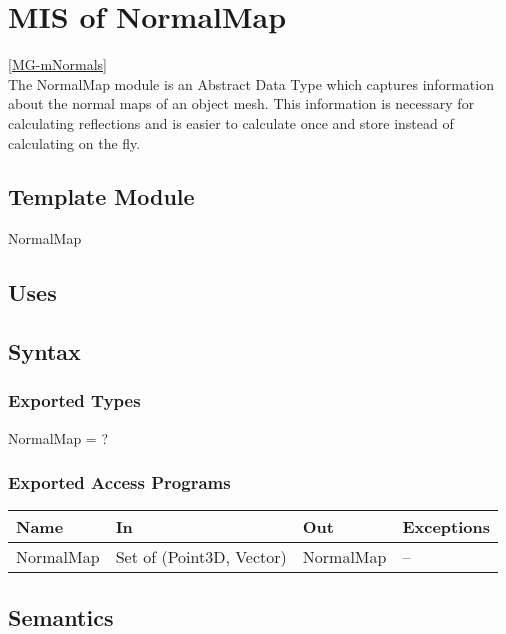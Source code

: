 \documentclass[12pt, titlepage]{article}
\begin{document}
\newpage

\section{MIS of NormalMap} \ref{MG-mNormals} \\
The NormalMap module is an Abstract Data Type which captures information about 
the normal maps of an object mesh. This information is necessary for 
calculating reflections and is easier to calculate once and store instead of 
calculating on the fly.

\subsection{Template Module}
NormalMap

\subsection{Uses}

\subsection{Syntax}
\subsubsection{Exported Types}
NormalMap = ?

\subsubsection{Exported Access Programs}
\begin{center}
	\begin{tabular}{p{3cm} p{4cm} p{2cm} p{4cm}}
		\hline
		\textbf{Name} & \textbf{In} & \textbf{Out} & \textbf{Exceptions} \\
		\hline
		NormalMap & Set of (Point3D, Vector) & NormalMap & -- \\
		\hline
	\end{tabular}
\end{center}


\subsection{Semantics}
\end{document}
